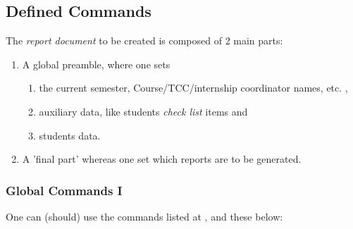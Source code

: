 \documentclass[dctools,english,tocdepth=3,secdepth=3]{ufrgscca} %
\begin{document}
\subsection{Defined Commands}
The \emph{report document} to be created is composed of 2 main parts:
\begin{enumerate}
	\item A global preamble, where one sets
	\begin{enumerate}
		\item the current semester, Course/TCC/internship coordinator names, etc. ,
		\item auxiliary data, like students \emph{check list} items and
		\item students data.
	\end{enumerate}
    \item A 'final part' whereas one set which reports are to be generated.
\end{enumerate}

\subsubsection{Global Commands I}
One can (should) use the commands listed at , and these below:
\end{document}

